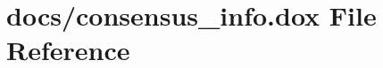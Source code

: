 \hypertarget{consensus__info_8dox}{}\section{docs/consensus\+\_\+info.dox File Reference}
\label{consensus__info_8dox}
